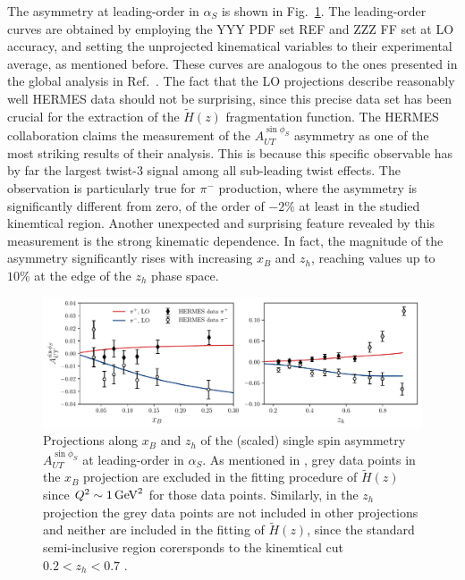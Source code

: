 The asymmetry at leading-order in $\alpha_S$ is shown in Fig.~\ref{fig:A_UT_LO}. The leading-order curves are obtained by employing the YYY PDF set REF and ZZZ FF set at LO accuracy, and setting the unprojected kinematical variables to their experimental average, as mentioned before. These curves are analogous to the ones presented in the global analysis in Ref.~\cite{Gamberg2022Htilde}. The fact that the LO projections describe reasonably well HERMES data should not be surprising, since this precise data set has been crucial for the extraction of the $\tilde{H}(z)$ fragmentation function. The HERMES collaboration claims the measurement of the $A_{UT}^{\sin\phi_S}$ asymmetry as one of the most striking results of their analysis. This is because this specific observable has by far the largest twist-3 signal among all sub-leading twist effects. The observation is particularly true for $\pi^-$ production, where the asymmetry is significantly different from zero, of the order of $-2\%$ at least in the studied kinemtical region. Another unexpected and surprising feature revealed by this measurement is the strong kinematic dependence. In fact, the magnitude of the asymmetry significantly rises with increasing $x_B$ and $z_h$, reaching values up to $10\%$ at the edge of the $z_h$ phase space. 
\begin{figure}[h]
    \centering
    \includegraphics[width=0.99\linewidth]{fig/A_UT_LO.pdf}
    \caption{Projections along $x_B$ and $z_h$ of the (scaled) single spin asymmetry $A_{UT}^{\sin\phi_S}$ at leading-order in $\alpha_S$. As mentioned in \cite{Gamberg2022Htilde}, grey data points in the $x_B$ projection are excluded in the fitting procedure of $\tilde{H}(z)$ since $Q^2\sim 1\,\rm{GeV}^2$ for those data points. Similarly, in the $z_h$ projection the grey data points are not included in other projections and neither are included in the fitting of $\tilde{H}(z)$, since the standard semi-inclusive region corersponds to the kinemtical cut $0.2 <z_h< 0.7$ \cite{hermescollaboration2020azimuthalsingledoublespinasymmetries}.}
    \label{fig:A_UT_LO}
\end{figure}

